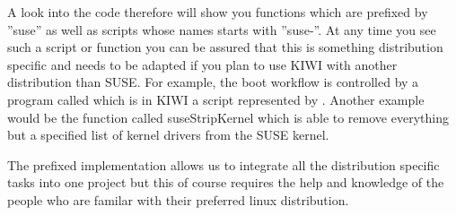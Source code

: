 A look into the code therefore will show you functions which are
prefixed by ''suse'' as well as scripts whose names starts with
''suse-''. At any time you see such a script or function
you can be assured that this is something distribution specific
and needs to be adapted if you plan to use KIWI with another
distribution than SUSE. For example, the boot workflow is controlled
by a program called  which is in KIWI a script represented
by . Another example would be the function called
suseStripKernel which is able to remove everything but a specified
list of kernel drivers from the SUSE kernel.

The prefixed implementation allows us to integrate all the
distribution specific tasks into one project but this of course
requires the help and knowledge of the people who are familar
with their preferred linux distribution. 
